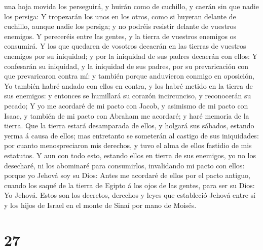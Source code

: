 una hoja movida los perseguirá, y huirán como de cuchillo, y caerán sin
que nadie los persiga:  Y tropezarán los unos en los
otros, como si huyeran delante de cuchillo, aunque nadie los persiga; y
no podréis resistir delante de vuestros enemigos.  Y
pereceréis entre las gentes, y la tierra de vuestros enemigos os
consumirá.  Y los que quedaren de vosotros decaerán en
las tierras de vuestros enemigos por su iniquidad; y por la iniquidad de
sus padres decaerán con ellos:  Y confesarán su
iniquidad, y la iniquidad de sus padres, por su prevaricación con que
prevaricaron contra mí: y también porque anduvieron conmigo en
oposición,  Yo también habré andado con ellos en contra,
y los habré metido en la tierra de sus enemigos: y entonces se humillará
su corazón incircunciso, y reconocerán su pecado;  Y yo
me acordaré de mi pacto con Jacob, y asimismo de mi pacto con Isaac, y
también de mi pacto con Abraham me acordaré; y haré memoria de la
tierra.  Que la tierra estará desamparada de ellos, y
holgará sus sábados, estando yerma á causa de ellos; mas entretanto se
someterán al castigo de sus iniquidades: por cuanto menospreciaron mis
derechos, y tuvo el alma de ellos fastidio de mis estatutos.
 Y aun con todo esto, estando ellos en tierra de sus
enemigos, yo no los desecharé, ni los abominaré para consumirlos,
invalidando mi pacto con ellos: porque yo Jehová soy su Dios:
 Antes me acordaré de ellos por el pacto antiguo, cuando
los saqué de la tierra de Egipto á los ojos de las gentes, para ser su
Dios: Yo Jehová.  Estos son los decretos, derechos y
leyes que estableció Jehová entre sí y los hijos de Israel en el monte
de Sinaí por mano de Moisés.

\hypertarget{section-26}{%
\section{27}\label{section-26}}

